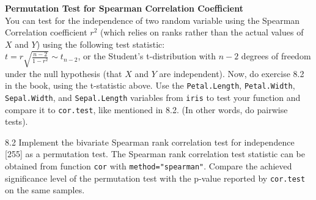 \documentclass[
]{article}
\begin{document}
\textbf{Permutation Test for Spearman Correlation Coefficient}\\
You can test for the independence of two random variable using the
Spearman Correlation coefficient \(r^2\) (which relies on ranks rather
than the actual values of \(X\) and \(Y\)) using the following test
statistic:\\
\(t=r\sqrt{\frac{n-2}{1-r^2}}\sim t_{n-2}\), or the Student's
t-distribution with \(n-2\) degrees of freedom under the null hypothesis
(that \(X\) and \(Y\) are independent). Now, do exercise 8.2 in the
book, using the t-statistic above. Use the \texttt{Petal.Length},
\texttt{Petal.Width}, \texttt{Sepal.Width}, and \texttt{Sepal.Length}
variables from \texttt{iris} to test your function and compare it to
\texttt{cor.test}, like mentioned in 8.2. (In other words, do pairwise
tests).

8.2 Implement the bivariate Spearman rank correlation test for
independence {[}255{]} as a permutation test. The Spearman rank
correlation test statistic can be obtained from function \texttt{cor}
with \texttt{method="spearman"}. Compare the achieved significance level
of the permutation test with the p-value reported by \texttt{cor.test}
on the same samples.
\end{document}
